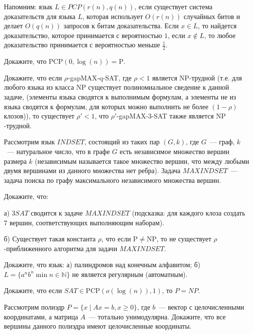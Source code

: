 \setcounter{curtask}{35}


Напомним: язык $L \in PCP(r(n), q(n))$, если существует система доказательств для
языка $L$, которая использует $O(r(n))$ случайных битов и делает $O(q(n))$ запросов
к битам доказательства. Если $x \in L$, то найдется доказательство, которое
принимается с вероятностью $1$, если $x \notin L$, то любое доказательство
принимается с вероятностью меньше $\frac{1}{2}$.


\begin{task}
    Докажите, что $\mathrm{PCP}(0, \log(n)) = \mathrm{P}$.
\end{task}

\begin{task}
    Докажите, что если $\rho${-gap}{MAX-q-SAT}, где $\rho < 1$ является
    $\mathrm{NP}$-трудной (т.е. для любого языка из класса $\mathrm{NP}$ существует
    полиномиальное сведение к данной задаче, (элементы языка сводятся к выполнимым
    формулам, а элементы не из языка сводятся к формулам, для которых можно выполнить
    не более $(1 - \rho)$ клозов)), то существует $\rho' < 1$, что
    $\rho'${-gap}{MAX-3-SAT}  также является $\mathrm{NP}$-трудной.
\end{task}

\begin{task}

    Рассмотрим язык $INDSET$, состоящий из таких пар $(G, k)$, где $G$~--- граф,
    $k$~--- натуральное число, что в графе $G$ есть независимое множество вершин
    размера $k$ (независимым называется такое множество вершин, что между любыми
    двумя вершинами из данного множества нет ребра). Задача $MAXINDSET$~--- задача
    поиска по графу максимального независимого множества вершин.
    
    Докажите, что:

    а) $3SAT$ сводится к задаче $MAXINDSET$ (подсказка: для каждого клоза создать $7$
    вершин, соответствующих выполняющим наборам).

    б) Существует такая константа $\rho$, что если $\mathrm{P} \neq \mathrm{NP}$, то
    не существует $\rho$-приближенного алгоритма для задачи $MAXINDSET$.
\end{task}

\begin{task}
    Докажите, что язык:
    а) палиндромов над конечным алфавитом;
    б) $L = \{a^nb^n \min n \in \mathbb{N}\}$ не является регулярным (автоматным).
\end{task}

\begin{task}
    Докажите, что если $SAT \in \mathrm{PCP}(o(\log(n)), 1)$, то $P = NP$.
\end{task}

\breakline

\begin{ptask}{29}
    Рассмотрим полиэдр $P = \{x \mid Ax = b, x \ge 0\}$, где $b$~--- вектор с
    целочисленными координатами, а матрица $A$~--- тотально унимодулярна. Докажите,
    что все вершины данного полиэдра имеют целочисленные координаты.
\end{ptask}